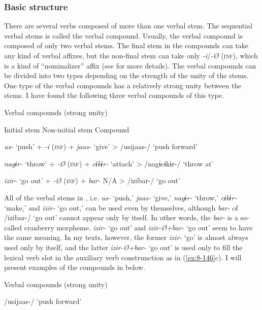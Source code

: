 \subsubsection{Basic structure}

There are several verbs composed of more than one verbal stem. The sequential verbal stems is called the verbal compound. Usually, the verbal compound is composed of only two verbal stems. The final stem in the compounds can take any kind of verbal affixes, but the non-final stem can take only \textit{{}-i}/\textit{{}-Ø} (\textsc{inf}), which is a kind of “nominalizer” affix (see  for more details). The verbal compounds can be divided into two types depending on the strength of the unity of the stems. One type of the verbal compounds has a relatively strong unity between the stems. I have found the following three verbal compounds of this type.

\begin{table}
\caption{\label{tab:key:85}Verbal compounds (strong unity)}

Initial stem    Non-initial stem    Compound

\textit{us-}  ‘push’  +  \textit{{}-i} (\textsc{inf})  +  \textit{jaas-}  ‘give’  >  /usijaas-/  ‘push forward’

\textit{nagɨr-}  ‘throw’  +  \textit{{}-Ø} (\textsc{inf})  +  \textit{cɨkɨr-}  ‘attach’  >  /nagɨcɨkɨr-/  ‘throw at’

\textit{izir-}  ‘go out’  +  \textit{{}-Ø} (\textsc{inf})  +  \textit{bar-}  N/A  >  /izibar-/  ‘go out’
\end{table}

All of the verbal stems in , i.e. \textit{us-} ‘push,’ \textit{jaas-} ‘give,’ \textit{nagɨr-} ‘throw,’ \textit{cɨkɨr-} ‘make,’ and \textit{izir-} ‘go out,’ can be used even by themselves, although \textit{bar-} of /izibar-/ ‘go out’ cannot appear only by itself. In other words, the \textit{bar-} is a so-called cranberry morpheme. \textit{izir-} ‘go out’ and \textit{izir-Ø+bar-} ‘go out’ seem to have the same meaning. In my texts, however, the former \textit{izir-} ‘go’ is almost always used only by itself, and the latter \textit{izir-Ø+bar-} ‘go out’ is used only to fill the lexical verb slot in the auxiliary verb construnction as in (\ref{ex:8-146}c). I will present examples of the compounds in  below.

\ea\label{ex:8-146}
  Verbal compounds (strong unity)

\ea /usijaas-/ ‘push forward’

